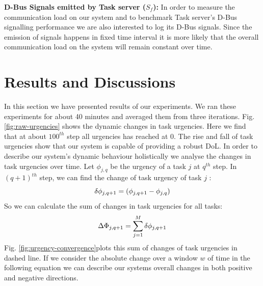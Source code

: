 \documentclass{llncs}
\begin{document}
%
\textbf{D-Bus Signals emitted by Task server ($S_f$):} 
In order to measure the communication load on our system and to benchmark Task server's D-Bus signalling performance we are also interested to log its D-Bus signals. Since the emission of signals happens in fixed time interval it is more likely that the overall communication load on the system will remain constant over time.
%
% 
\section{Results and Discussions}
\label{sec:results}
In this section we have presented results of our experiments. We ran these experiments for about 40 minutes and averaged them from three iterations. 
Fig. \ref{fig:raw-urgencies} shows the dynamic changes in task urgencies. Here we find that at about $100^{th}$ step all urgencies has reached at 0. The rise and fall of task urgencies show that our system is capable of providing a robust DoL. 
In order to describe our system's dynamic behaviour holistically we analyse the changes in task urgencies over time. Let $ \phi_{j, q}$ be the urgency of a task $j$ at $q^{th}$ step. In $(q+1)^{th}$ step, we can find the change of task urgency of task $j$ :\\

\begin{equation} 
\small
\delta \phi_{j, q+1} = ( \phi_{j, q+1} - \phi_{j, q}) 
\end{equation}
So we can calculate the sum of changes in task urgencies for all tasks:
\begin{equation} 
\small
\Delta \Phi_{j, q+1} = \sum_{j=1}^{M} \delta \phi_{j, q+1} 
\label{eqn:Delta-Phi}
\end{equation}
 Fig. \ref{fig:urgency-convergence}plots  this sum of changes of task urgencies in dashed line. If we consider the absolute change over a window $w$ of time in the following equation we can describe our systems overall changes in both positive and negative directions.
\end{document}

